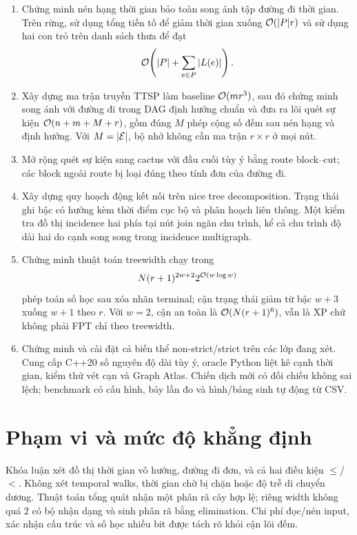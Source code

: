 \begin{enumerate}[label=\textbf{C\arabic*.}]
  \item Chứng minh nén hạng thời gian bảo toàn song ánh tập đường đi thời gian. Trên rừng, sử dụng tổng tiền tố để giảm thời gian xuống $\mathcal{O}(|P|r)$ và sử dụng hai con trỏ trên danh sách thưa để đạt
  \[
    \mathcal{O}\!\left(|P|+\sum_{e\in P}|L(e)|\right).
  \]
  \item Xây dựng ma trận truyền TTSP làm baseline $\mathcal{O}(mr^3)$, sau đó chứng minh song ánh với đường đi trong DAG định hướng chuẩn và đưa ra lõi quét sự kiện $\mathcal{O}(n+m+M+r)$, gồm đúng $M$ phép cộng số đếm sau nén hạng và định hướng. Với $M=|\mathcal{E}|$, bộ nhớ không cần ma trận $r\times r$ ở mọi nút.
  \item Mở rộng quét sự kiện sang cactus với đầu cuối tùy ý bằng route block--cut; các block ngoài route bị loại đúng theo tính đơn của đường đi.
  \item Xây dựng quy hoạch động kết nối trên nice tree decomposition. Trạng thái ghi bậc có hướng kèm thời điểm cục bộ và phân hoạch liên thông. Một kiểm tra đồ thị incidence hai phía tại nút join ngăn chu trình, kể cả chu trình độ dài hai do cạnh song song trong incidence multigraph.
  \item Chứng minh thuật toán treewidth chạy trong
  \[
    N(r+1)^{2w+2}2^{\mathcal{O}(w\log w)}
  \]
  phép toán số học sau xóa nhãn terminal; cận trạng thái giảm từ bậc $w+3$ xuống $w+1$ theo $r$. Với $w=2$, cận an toàn là $\mathcal{O}(N(r+1)^6)$, vẫn là XP chứ không phải FPT chỉ theo treewidth.
  \item Chứng minh và cài đặt cả biến thể non-strict/strict trên các lớp đang xét. Cung cấp C++20 số nguyên độ dài tùy ý, oracle Python liệt kê cạnh thời gian, kiểm thử vét cạn và Graph Atlas. Chiến dịch mới có \AuditComparisons{} đối chiếu không sai lệch; benchmark có \BenchCases{} cấu hình, bảy lần đo và hình/bảng sinh tự động từ CSV.
\end{enumerate}

\section{Phạm vi và mức độ khẳng định}

Khóa luận xét đồ thị thời gian vô hướng, đường đi đơn, và cả hai điều kiện $\le$/$<$. Không xét temporal walks, thời gian chờ bị chặn hoặc độ trễ di chuyển dương. Thuật toán tổng quát nhận một phân rã cây hợp lệ; riêng width không quá $2$ có bộ nhận dạng và sinh phân rã bằng elimination. Chi phí đọc/nén input, xác nhận cấu trúc và số học nhiều bit được tách rõ khỏi cận lõi đếm.

